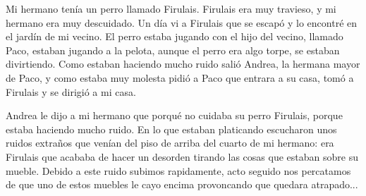 \documentclass{article}
\begin{document}
Mi hermano tenía un perro llamado Firulais. Firulais era muy travieso, y mi hermano era muy descuidado. Un día vi a Firulais que se escapó y lo encontré en el jardín de mi vecino.
El perro estaba jugando con el hijo del vecino, llamado Paco, estaban jugando a la pelota, aunque el perro era algo torpe, se estaban divirtiendo. Como estaban haciendo mucho ruido salió Andrea, la hermana mayor de Paco, y como estaba muy molesta pidió a Paco que entrara a su casa, tomó a Firulais y se dirigió a mi casa.

Andrea le dijo a mi hermano que porqué no cuidaba su perro Firulais, porque estaba haciendo mucho ruido. En lo que estaban platicando escucharon unos ruidos extraños que venían del piso de arriba del cuarto de mi hermano: era Firulais que acababa de hacer un desorden tirando las cosas que estaban sobre su mueble. Debido a este ruido subimos rapidamente, acto seguido nos percatamos de que uno de estos muebles le cayo encima provoncando que quedara atrapado...
\end{document}
